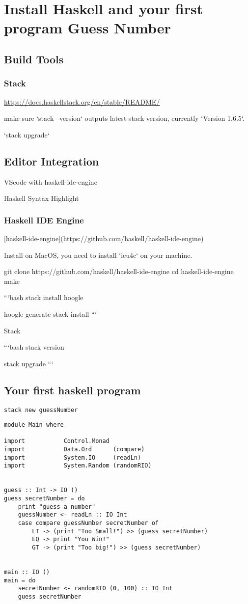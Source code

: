 \chapter{Install Haskell and your first program Guess Number}

\section{Build Tools}
\subsection{Stack}

\url{https://docs.haskellstack.org/en/stable/README/}

make sure `stack --version` outputs latest stack version, currently `Version 1.6.5`.

`stack upgrade`
\section{Editor Integration}

 VScode with haskell-ide-engine

Haskell Syntax Highlight
\subsection{Haskell IDE Engine}
[haskell-ide-engine](https://github.com/haskell/haskell-ide-engine)

Install on MacOS, you need to install `icu4c` on your machine.

git clone https://github.com/haskell/haskell-ide-engine
cd haskell-ide-engine
make



```bash
stack install hoogle

hoogle generate
stack install
```

 Stack

```bash
stack version

stack upgrade
```

\section{Your first haskell program}

\verb|stack new guessNumber|

\begin{verbatim}
module Main where

import           Control.Monad
import           Data.Ord      (compare)
import           System.IO     (readLn)
import           System.Random (randomRIO)


guess :: Int -> IO ()
guess secretNumber = do
    print "guess a number"
    guessNumber <- readLn :: IO Int
    case compare guessNumber secretNumber of
        LT -> (print "Too Small!") >> (guess secretNumber)
        EQ -> print "You Win!"
        GT -> (print "Too big!") >> (guess secretNumber)


main :: IO ()
main = do
    secretNumber <- randomRIO (0, 100) :: IO Int
    guess secretNumber

\end{verbatim}
